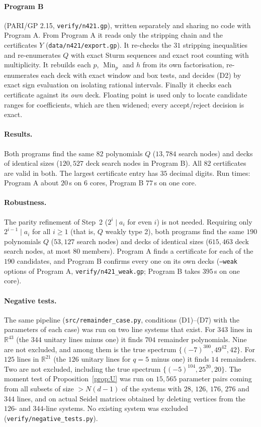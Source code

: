 \documentclass[11pt]{article}
\theoremstyle{definition}
\newcommand{\R}{\mathbb{R}}
\newcommand{\Min}{\operatorname{Min}}
\begin{document}
\paragraph{Program B} (PARI/GP 2.15, \texttt{verify/n421.gp}), written separately and sharing no
code with Program A. From Program A it reads only the stripping chain and the certificates $Y$
(\texttt{data/n421/export.gp}). It re-checks the $31$ stripping inequalities and re-enumerates $Q$
with exact Sturm sequences and exact root counting with multiplicity. It rebuilds each $p$, $\Min_p$
and $h$ from its own factorisation, re-enumerates each deck with exact window and box tests, and
decides (D2) by exact sign evaluation on isolating rational intervals. Finally it checks each
certificate against its \emph{own} deck. Floating point is used only to locate candidate ranges for
coefficients, which are then widened; every accept/reject decision is exact.

\paragraph{Results.} Both programs find the same $82$ polynomials $Q$ ($13{,}784$ search nodes) and
decks of identical sizes ($120{,}527$ deck search nodes in Program B). All $82$ certificates are valid
in both. The largest certificate entry has $35$ decimal digits. Run times: Program A about $20$\,s on
$6$ cores, Program B $77$\,s on one core.

\paragraph{Robustness.} The parity refinement of Step~2 ($2^i\mid a_i$ for even $i$) is not needed.
Requiring only $2^{i-1}\mid a_i$ for all $i\ge1$ (that is, $Q$ weakly type 2), both programs find the
same $190$ polynomials $Q$ ($53{,}127$ search nodes) and decks of identical sizes ($615{,}463$ deck search
nodes, at most $80$ members). Program A finds a certificate for each of the $190$ candidates, and
Program B confirms every one on its own decks (\texttt{--weak} options of Program A,
\texttt{verify/n421\_weak.gp}; Program B takes $395$\,s on one core).

\paragraph{Negative tests.} The same pipeline (\texttt{src/remainder\_case.py}, conditions (D1)--(D7)
with the parameters of each case) was run on two line systems that exist. For $343$ lines in
$\R^{43}$ (the $344$ unitary lines minus one) it finds $704$ remainder polynomials. Nine are not
excluded, and among them is the true spectrum $\{(-7)^{300},49^{42},42\}$. For $125$ lines in
$\R^{21}$ (the $126$ unitary lines for $q=5$ minus one) it finds $14$ remainders. Two are not
excluded, including the true spectrum $\{(-5)^{104},25^{20},20\}$. The moment test of
Proposition~\ref{prop:U} was run on $15{,}565$ parameter pairs coming from all subsets of size
$>N(d-1)$ of the systems with $28$, $126$, $176$, $276$ and $344$ lines, and on actual Seidel matrices
obtained by deleting vertices from the $126$- and $344$-line systems. No existing system was excluded
(\texttt{verify/negative\_tests.py}).
\end{document}
